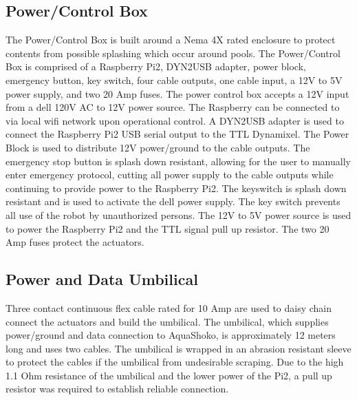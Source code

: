 \subsection{Power/Control Box}
The Power/Control Box is built around a Nema 4X rated enclosure to protect contents from possible splashing which occur around pools. The Power/Control Box is comprised of a Raspberry Pi2, DYN2USB adapter, power block, emergency button, key switch, four cable outputs, one cable input, a 12V to 5V power supply, and two 20 Amp fuses. The power control box accepts a 12V input from a dell 120V AC to 12V power source.
The Raspberry can be connected to via local wifi network upon operational control. 
A DYN2USB adapter is used to connect the Raspberry Pi2 USB serial output to the TTL Dynamixel. 
The Power Block is used to distribute 12V power/ground to the cable outputs.
The emergency stop button is splash down resistant, allowing for the user to manually enter emergency protocol, cutting all power supply to the cable outputs while continuing to provide power to the Raspberry Pi2.
The keyswitch is splash down resistant and is used to activate the dell power supply. The key switch prevents all use of the robot by unauthorized persons. The 12V to 5V power source is used to power the Raspberry Pi2 and the TTL signal pull up resistor.
The two 20 Amp fuses protect the actuators.


\subsection{Power and Data Umbilical}
Three contact continuous flex cable rated for 10 Amp are used to daisy chain connect the actuators and build the umbilical. %
The umbilical, which supplies power/ground and data connection to AquaShoko, is approximately 12 meters long and uses two cables. The umbilical is wrapped in an abrasion resistant sleeve to protect the cables if the umbilical from undesirable scraping. Due to the high 1.1 Ohm resistance of the umbilical and the lower power of the Pi2, a pull up resistor was required to establish reliable connection. 

